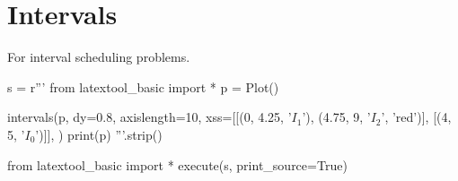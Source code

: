 \newpage
\section{Intervals}

For interval scheduling problems.

\begin{python}
s = r'''
from latextool_basic import *
p = Plot()

intervals(p,
          dy=0.8,
          axislength=10,
          xss=[[(0, 4.25, '$I_1$'), (4.75, 9, '$I_2$', 'red')],
               [(4, 5, '$I_0$')]],
         )
print(p)
'''.strip()

from latextool_basic import *
execute(s, print_source=True)
\end{python}


